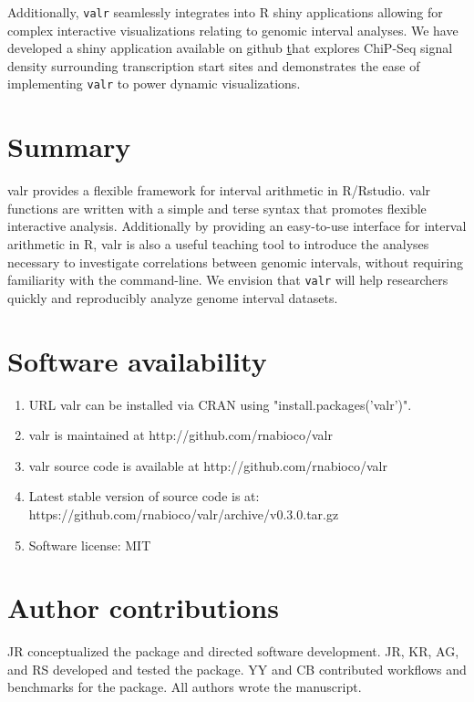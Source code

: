 \documentclass[9pt,a4paper]{extarticle}
\begin{document}
Additionally, \texttt{valr} seamlessly integrates into R shiny applications allowing for complex interactive visualizations relating to genomic interval analyses. We have developed a shiny application available on github \href{https://github.com/rnabioco/valrdata} that explores ChiP-Seq signal density surrounding transcription start sites and demonstrates the ease of implementing \texttt{valr} to power dynamic visualizations.

\section*{Summary} %
valr provides a flexible framework for interval arithmetic in R/Rstudio. valr functions are written with a simple and terse syntax that promotes flexible interactive analysis. Additionally by providing an easy-to-use interface for interval arithmetic in R, valr is also a useful teaching tool to introduce the analyses necessary to investigate correlations between genomic intervals, without requiring familiarity with the command-line. We envision that \texttt{valr} will help researchers quickly and reproducibly analyze genome interval datasets.

\section*{Software availability}
\begin{enumerate}
\item URL valr can be installed via CRAN using "install.packages('valr')".
\item valr is maintained at http://github.com/rnabioco/valr
\item valr source code is available at http://github.com/rnabioco/valr
\item Latest stable version of source code is at: https://github.com/rnabioco/valr/archive/v0.3.0.tar.gz
\item Software license: MIT
\end{enumerate}

\section*{Author contributions}

JR conceptualized the package and directed software development. JR, KR, AG, and RS developed and tested the package.  YY and CB contributed workflows and benchmarks for the package. All authors wrote the manuscript.
\end{document}
